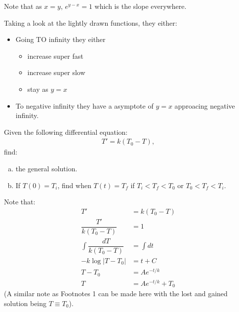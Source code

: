 \documentclass{article}
\begin{document}
    \newpage
    \begin{solution}[Solution 2b]
        Note that as $x=y$, $e^{y-x} = 1$ which is the slope everywhere.
    \end{solution}
    \begin{solution}[Solution 2c]
        Taking a look at the lightly drawn functions, they either:
        \begin{itemize}
            \item Going TO infinity they either
            \begin{itemize}
                \item increase super fast
                \item increase super slow
                \item stay as $y=x$
            \end{itemize}
            \item To negative infinity they have a asymptote of $y=x$ approacing negative infinity.
        \end{itemize} 
    \end{solution}
    \newpage 
    \begin{problem}
        Given the following differential equation:
        \begin{align}
            T' = k(T_0 - T),
        \end{align}
        find:
        \begin{enumerate}[(a)]
            \item the general solution.
            \item If $T(0) = T_i$, find when $T(t) = T_f$ if $T_i < T_f < T_0$ or $T_0 < T_f < T_i$.
        \end{enumerate}
    \end{problem}
    \begin{solution}[Solution 3a]
        Note that:
        \begin{align}
            T' &= k(T_0 - T) \\ 
            \dfrac{T'}{k(T_0 -T)} &= 1 \\
            \int \dfrac{dT}{k(T_0 - T)} &= \int dt \\ 
            -k \log |T-T_0| &= t + C\\ 
            T-T_0 &= Ae^{-t/k} \\
            T &= Ae^{-t/k} + T_0
        \end{align}
        (A similar note as Footnotes 1 can be made here with the lost and gained solution being $T \equiv T_0$).
    \end{solution}
\end{document}
